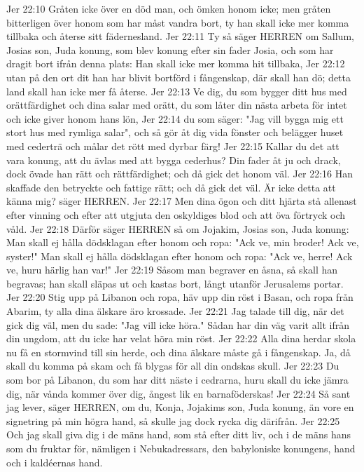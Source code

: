 Jer 22:10  Gråten icke över en död man, och ömken honom icke; men gråten bitterligen över honom som har måst vandra bort, ty han skall icke mer komma tillbaka och återse sitt fädernesland.
Jer 22:11  Ty så säger HERREN om Sallum, Josias son, Juda konung, som blev konung efter sin fader Josia, och som har dragit bort ifrån denna plats: Han skall icke mer komma hit tillbaka,
Jer 22:12  utan på den ort dit han har blivit bortförd i fångenskap, där skall han dö; detta land skall han icke mer få återse.
Jer 22:13  Ve dig, du som bygger ditt hus med orättfärdighet och dina salar med orätt, du som låter din nästa arbeta för intet och icke giver honom hans lön,
Jer 22:14  du som säger: "Jag vill bygga mig ett stort hus med rymliga salar", och så gör åt dig vida fönster och belägger huset med cederträ och målar det rött med dyrbar färg!
Jer 22:15  Kallar du det att vara konung, att du ävlas med att bygga cederhus? Din fader åt ju och drack, dock övade han rätt och rättfärdighet; och då gick det honom väl.
Jer 22:16  Han skaffade den betryckte och fattige rätt; och då gick det väl. Är icke detta att känna mig? säger HERREN.
Jer 22:17  Men dina ögon och ditt hjärta stå allenast efter vinning och efter att utgjuta den oskyldiges blod och att öva förtryck och våld.
Jer 22:18  Därför säger HERREN så om Jojakim, Josias son, Juda konung: Man skall ej hålla dödsklagan efter honom och ropa: "Ack ve, min broder! Ack ve, syster!" Man skall ej hålla dödsklagan efter honom och ropa: "Ack ve, herre! Ack ve, huru härlig han var!"
Jer 22:19  Såsom man begraver en åsna, så skall han begravas; han skall släpas ut och kastas bort, långt utanför Jerusalems portar.
Jer 22:20  Stig upp på Libanon och ropa, häv upp din röst i Basan, och ropa från Abarim, ty alla dina älskare äro krossade.
Jer 22:21  Jag talade till dig, när det gick dig väl, men du sade: "Jag vill icke höra." Sådan har din väg varit allt ifrån din ungdom, att du icke har velat höra min röst.
Jer 22:22  Alla dina herdar skola nu få en stormvind till sin herde, och dina älskare måste gå i fångenskap. Ja, då skall du komma på skam och få blygas för all din ondskas skull.
Jer 22:23  Du som bor på Libanon, du som har ditt näste i cedrarna, huru skall du icke jämra dig, när vånda kommer över dig, ångest lik en barnaföderskas!
Jer 22:24  Så sant jag lever, säger HERREN, om du, Konja, Jojakims son, Juda konung, än vore en signetring på min högra hand, så skulle jag dock rycka dig därifrån.
Jer 22:25  Och jag skall giva dig i de mäns hand, som stå efter ditt liv, och i de mäns hans som du fruktar för, nämligen i Nebukadressars, den babyloniske konungens, hand och i kaldéernas hand.
